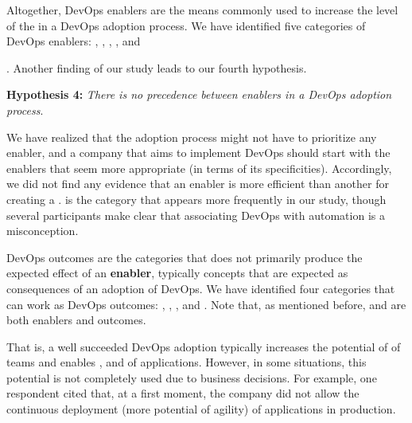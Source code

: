 Altogether, DevOps enablers are the means commonly used to increase the level of
the \cc in a DevOps adoption process.
We have identified five categories of DevOps enablers:
, , ,
, and {. Another finding of our
study leads to our fourth hypothesis.

\begin{mh}
\textbf{Hypothesis 4:} \textit{There is no precedence between enablers in a DevOps adoption process}.
\end{mh}

We have realized that the adoption process might not have
to prioritize any enabler, and a company that aims to implement
DevOps should start with  the enablers that seem more appropriate (in terms
of its specificities). Accordingly, we did not find any evidence that an enabler
is more efficient than another for creating a \cc.  is the category
that appears more frequently in our study, though several participants make
clear that associating DevOps with automation is a misconception.


DevOps outcomes are the categories that does not primarily produce the
expected effect of an {\bf enabler}, typically concepts that are expected as
consequences of an adoption of DevOps. We have identified four categories that
can work as DevOps outcomes: , ,
, and . Note that,
as mentioned before,  and 
are both enablers and outcomes.

That is, a well succeeded DevOps adoption typically increases the potential of
 of teams and enables ,  and
 of applications.
However, in some situations, this potential is not completely used due to business
decisions. For example, one respondent cited that, at a first moment, the
company did not allow the continuous deployment (more potential of agility)
of applications in production.

}
